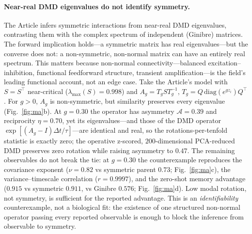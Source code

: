 \documentclass[pdflatex,sn-nature]{sn-jnl}
\newcommand{\asym}{\mathcal{A}}
\begin{document}
\paragraph{Near-real DMD eigenvalues do not identify symmetry.}
The Article infers symmetric interactions from near-real DMD eigenvalues,
contrasting them with the complex spectrum of independent (Ginibre) matrices.
The forward implication holds---a symmetric matrix has real
eigenvalues---but the converse does not: a non-symmetric, non-normal matrix can
have an entirely real spectrum\cite{hornjohnson2013,trefethen2005}. This matters
because non-normal connectivity---balanced excitation--inhibition, functional
feedforward structure, transient amplification---is the field's leading
functional account, not an edge case\cite{murphy2009,goldman2009,hennequin2014,
bondanelli2020}. Take the Article's model with $S=S^\top$ near-critical
($\lambda_{\max}(S)=0.998$) and $A_g=T_gST_g^{-1}$, $T_g=Q\,\mathrm{diag}(e^{gz_i})Q^\top$.
For $g>0$, $A_g$ is non-symmetric, but similarity preserves every eigenvalue
(Fig.~\ref{fig:ma}b). At $g=0.30$ the operator has asymmetry
$\asym=0.39$ and reciprocity $\eta=0.70$, yet its eigenvalues---and those of the
DMD operator $\exp[(A_g-I)\Delta t/\tau]$---are identical and real, so the
rotations-per-tenfold statistic is exactly zero; the operative z-scored,
$200$-dimensional PCA-reduced DMD preserves zero rotation while raising asymmetry
to $0.47$. The remaining observables do not break the tie: at $g=0.30$ the
counterexample reproduces the covariance exponent ($\nu=0.82$ vs symmetric parent
$0.73$; Fig.~\ref{fig:ma}c), the variance--timescale correlation ($r=0.9997$),
and the zero-shot memory advantage ($0.915$ vs symmetric $0.911$, vs Ginibre
$0.576$; Fig.~\ref{fig:ma}d). Low modal rotation, not symmetry, is sufficient for
the reported advantage. This is an \emph{identifiability} counterexample, not a
biological fit: the existence of one structured non-normal operator passing every
reported observable is enough to block the inference from observable to symmetry.
\end{document}

